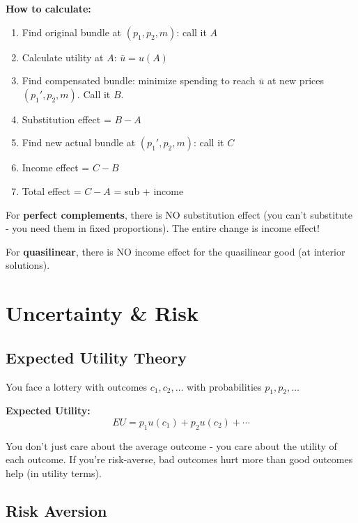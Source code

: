 \documentclass[11pt]{article}
\begin{document}
\begin{steps}
\textbf{How to calculate:}
\begin{enumerate}
    \item Find original bundle at $(p_1, p_2, m)$: call it $A$
    \item Calculate utility at $A$: $\bar{u} = u(A)$
    \item Find compensated bundle: minimize spending to reach $\bar{u}$ at new prices $(p_1', p_2, m)$. Call it $B$.
    \item Substitution effect = $B - A$
    \item Find new actual bundle at $(p_1', p_2, m)$: call it $C$
    \item Income effect = $C - B$
    \item Total effect = $C - A$ = sub + income
\end{enumerate}
\end{steps}

\begin{warning}
For \textbf{perfect complements}, there is NO substitution effect (you can't substitute - you need them in fixed proportions). The entire change is income effect!

For \textbf{quasilinear}, there is NO income effect for the quasilinear good (at interior solutions).
\end{warning}

\section{Uncertainty \& Risk}

\subsection{Expected Utility Theory}

You face a lottery with outcomes $c_1, c_2, \ldots$ with probabilities $p_1, p_2, \ldots$

\textbf{Expected Utility:}
$$EU = p_1 u(c_1) + p_2 u(c_2) + \cdots$$

\begin{intuition}
You don't just care about the average outcome - you care about the utility of each outcome. If you're risk-averse, bad outcomes hurt more than good outcomes help (in utility terms).
\end{intuition}

\subsection{Risk Aversion}
\end{document}
